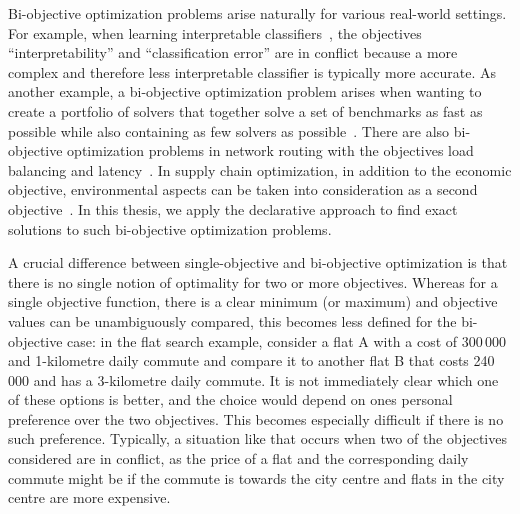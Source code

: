 Bi-objective optimization problems arise naturally for various real-world settings.
For example, when learning interpretable classifiers~\autocites{DBLP:conf/ijcai/Ignatiev0NS21,DBLP:conf/cp/MaliotovM18,DBLP:conf/ijcai/NarodytskaIPM18,DBLP:conf/ijcai/Hu0HH20,DBLP:conf/cp/YuISB20,DBLP:conf/aaai/Ignatiev0S021,DBLP:conf/cade/IgnatievPNM18}, the objectives ``interpretability'' and ``classification error'' are in conflict because a more complex and therefore less interpretable classifier is typically more accurate.
As another example, a bi-objective optimization problem arises when wanting to create a portfolio of solvers that together solve a set of benchmarks as fast as possible while also containing as few solvers as possible~\autocite{DBLP:conf/cp/JanotaMSM21}.
There are also bi-objective optimization problems in network routing with the objectives load balancing and latency~\autocite{SilverioEtAl2022biobjectiveoptimization}.
In supply chain optimization, in addition to the economic objective, environmental aspects can be taken into consideration as a second objective~\autocites{DBLP:journals/cce/Pinto-VarelaBN11,DBLP:journals/candie/TautenhainBN19}.
In this thesis, we apply the declarative approach to find exact solutions to such bi-objective optimization problems.

A crucial difference between single-objective and bi-objective optimization is that there is no single notion of optimality for two or more objectives.
Whereas for a single objective function, there is a clear minimum (or maximum) and objective values can be unambiguously compared, this becomes less defined for the bi-objective case:
in the flat search example, consider a flat A with a cost of 300\,000 \texteuro{} and 1-kilometre daily commute and compare it to another flat B that costs 240\,000 \texteuro{} and has a 3-kilometre daily commute.
It is not immediately clear which one of these options is better, and the choice would depend on ones personal preference over the two objectives.
This becomes especially difficult if there is no such preference.
Typically, a situation like that occurs when two of the objectives considered are in conflict, as the price of a flat and the corresponding daily commute might be if the commute is towards the city centre and flats in the city centre are more expensive.

